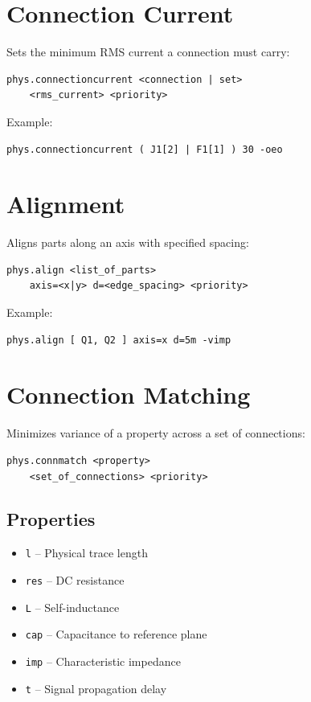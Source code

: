 \documentclass{report}
\begin{document}
\section{Connection Current}
Sets the minimum RMS current a connection must carry:
\begin{verbatim}
phys.connectioncurrent <connection | set> 
    <rms_current> <priority>
\end{verbatim}

Example:
\begin{verbatim}
phys.connectioncurrent ( J1[2] | F1[1] ) 30 -oeo
\end{verbatim}

\section{Alignment}
Aligns parts along an axis with specified spacing:
\begin{verbatim}
phys.align <list_of_parts> 
    axis=<x|y> d=<edge_spacing> <priority>
\end{verbatim}

Example:
\begin{verbatim}
phys.align [ Q1, Q2 ] axis=x d=5m -vimp
\end{verbatim}

\section{Connection Matching}
Minimizes variance of a property across a set of connections:
\begin{verbatim}
phys.connmatch <property> 
    <set_of_connections> <priority>
\end{verbatim}

\subsection{Properties}
\begin{itemize}
\item \texttt{l} -- Physical trace length
\item \texttt{res} -- DC resistance
\item \texttt{L} -- Self-inductance
\item \texttt{cap} -- Capacitance to reference plane
\item \texttt{imp} -- Characteristic impedance
\item \texttt{t} -- Signal propagation delay
\end{itemize}
\end{document}
